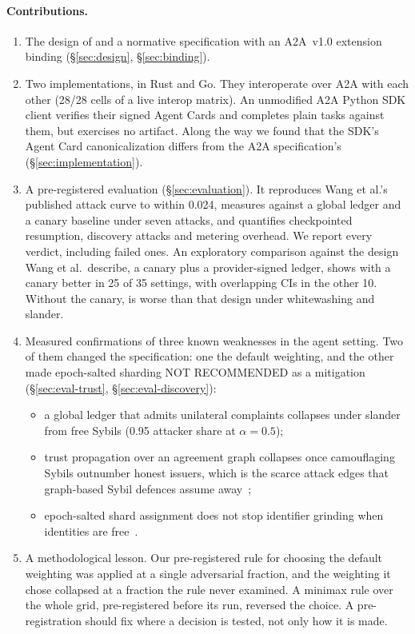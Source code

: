 \paragraph{Contributions.}
\begin{enumerate}
\item The design of \sys{} and a normative specification with an A2A~v1.0
  extension binding (\S\ref{sec:design}, \S\ref{sec:binding}).
\item Two implementations, in Rust and Go. They interoperate over A2A with
  each other (28/28 cells of a live interop matrix). An unmodified A2A
  Python SDK client verifies their signed Agent Cards and completes plain
  tasks against them, but exercises no \sys{} artifact. Along the way we
  found that the SDK's Agent Card
  canonicalization differs from the A2A specification's
  (\S\ref{sec:implementation}).
\item A pre-registered evaluation (\S\ref{sec:evaluation}). It reproduces
  Wang et al.'s published attack curve to within 0.024, measures \sys{}
  against a global ledger and a canary baseline under seven attacks, and
  quantifies checkpointed resumption, discovery attacks and metering
  overhead. We report every verdict, including failed ones. An
  exploratory comparison against the design Wang et al.\ describe, a
  canary plus a provider-signed ledger, shows \sys{} with a canary
  better in 25 of 35 settings, with overlapping CIs in the other 10. Without the canary, \sys{} is
  worse than that design under whitewashing and slander.
\item Measured confirmations of three known weaknesses in the agent
  setting. Two of them changed the specification: one the default
  weighting, and the other made epoch-salted sharding NOT RECOMMENDED as
  a mitigation
  (\S\ref{sec:eval-trust}, \S\ref{sec:eval-discovery}):
  \begin{itemize}
  \item a global ledger that admits unilateral complaints collapses under
    slander from free Sybils (0.95 attacker share at $\alpha{=}0.5$);
  \item trust propagation over an agreement graph collapses once
    camouflaging Sybils outnumber honest issuers, which is the scarce
    attack edges that graph-based Sybil defences assume
    away~\cite{yu2006sybilguard};
  \item epoch-salted shard assignment does not stop identifier grinding
    when identities are free~\cite{douceur2002sybil}.
  \end{itemize}
\item A methodological lesson. Our pre-registered rule for choosing the
  default weighting was applied at a single adversarial fraction, and the
  weighting it chose collapsed at a fraction the rule never examined. A
  minimax rule over the whole grid, pre-registered before its run,
  reversed the choice. A pre-registration should fix where a decision is
  tested, not only how it is made.
\end{enumerate}

